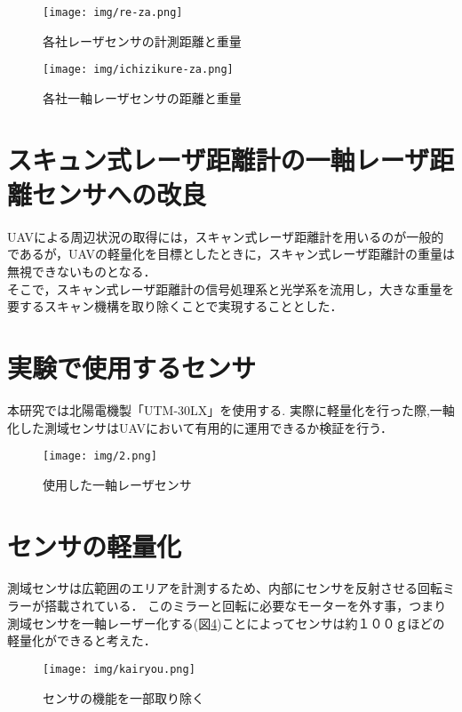 \documentclass[12pt,oneside]{sotsuken_paper}
\begin{document}
\begin{figure}[H]
\begin{center}
\texttt{[image: img/re-za.png]}
\end{center}
\caption{各社レーザセンサの計測距離と重量}
\label{fig:re-za}
\end{figure}

\begin{figure}[H]
\begin{center}
\texttt{[image: img/ichizikure-za.png]}
\end{center}
\caption{各社一軸レーザセンサの距離と重量}
\label{fig:re-za2}
\end{figure}


\section{スキュン式レーザ距離計の一軸レーザ距離センサへの改良}
UAVによる周辺状況の取得には，スキャン式レーザ距離計を用いるのが一般的であるが，UAVの軽量化を目標としたときに，スキャン式レーザ距離計の重量は無視できないものとなる．\\
そこで，スキャン式レーザ距離計の信号処理系と光学系を流用し，大きな重量を要するスキャン機構を取り除くことで実現することとした．

\section{実験で使用するセンサ}
本研究では北陽電機製「UTM-30LX」を使用する.
実際に軽量化を行った際,一軸化した測域センサはUAVにおいて有用的に運用できるか検証を行う．

\begin{figure}[H]
\begin{center}
\texttt{[image: img/2.png]}
\end{center}
\caption{使用した一軸レーザセンサ}
\label{fig:2}
\end{figure}

\section{センサの軽量化}
測域センサは広範囲のエリアを計測するため、内部にセンサを反射させる回転ミラーが搭載されている．
このミラーと回転に必要なモーターを外す事，つまり測域センサを一軸レーザー化する(図\ref{fig:kairyou})ことによってセンサは約１００ｇほどの軽量化ができると考えた．

\begin{figure}[H]
\begin{center}
\texttt{[image: img/kairyou.png]}
\end{center}
\caption{センサの機能を一部取り除く}
\label{fig:kairyou}
\end{figure}
\end{document}
